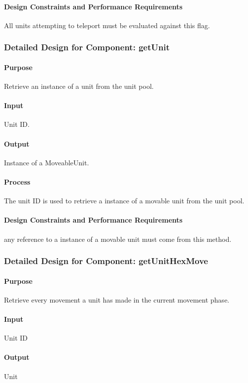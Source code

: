 \documentclass[12pt,a4paper,titlepage]{article}
\begin{document}
\paragraph{Design Constraints and Performance Requirements} All units attempting to teleport must be evaluated against this flag.

\subsubsection{Detailed Design for Component: getUnit}
\paragraph{Purpose} Retrieve an instance of a unit from the unit pool.
\paragraph{Input}  Unit ID.
\paragraph{Output} Instance of a MoveableUnit.
\paragraph{Process} The unit ID is used to retrieve a instance of a movable unit from the unit pool.
\paragraph{Design Constraints and Performance Requirements} any reference to a instance of a movable unit must come from this method.

\subsubsection{Detailed Design for Component: getUnitHexMove}
\paragraph{Purpose} Retrieve every movement a unit has made in the current movement phase.
\paragraph{Input} Unit ID
\paragraph{Output} Unit
\end{document}
